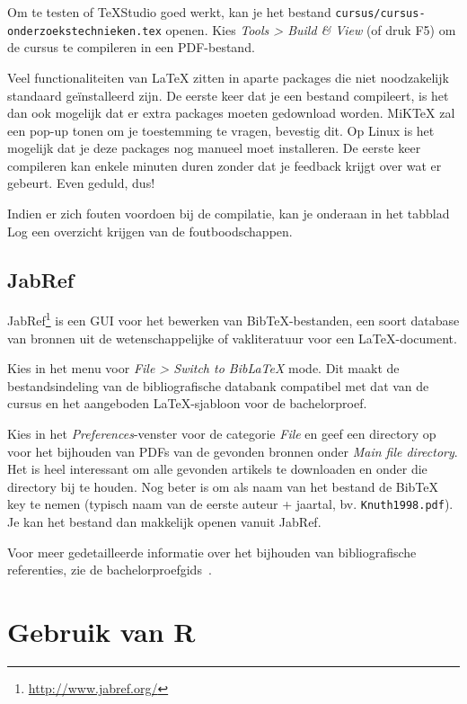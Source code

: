 Om te testen of TeXStudio goed werkt, kan je het bestand \texttt{cursus/cursus-onderzoekstechnieken.tex} openen. Kies \emph{Tools > Build \& View} (of druk F5) om de cursus te compileren in een PDF-bestand.

Veel functionaliteiten van \LaTeX{} zitten in aparte packages die niet noodzakelijk standaard geïnstalleerd zijn. De eerste keer dat je een bestand compileert, is het dan ook mogelijk dat er extra packages moeten gedownload worden. MiK\TeX{} zal een pop-up tonen om je toestemming te vragen, bevestig dit. Op Linux is het mogelijk dat je deze packages nog manueel moet installeren. De eerste keer compileren kan enkele minuten duren zonder dat je feedback krijgt over wat er gebeurt. Even geduld, dus!

Indien er zich fouten voordoen bij de compilatie, kan je onderaan in het tabblad Log een overzicht krijgen van de foutboodschappen.

\subsection{JabRef}

JabRef\footnote{\url{http://www.jabref.org/}} is een GUI voor het bewerken van Bib\TeX{}-bestanden, een soort database van bronnen uit de wetenschappelijke of vakliteratuur voor een \LaTeX{}-document.

Kies in het menu voor \emph{File > Switch to BibLaTeX} mode. Dit maakt de bestandsindeling van de bibliografische databank compatibel met dat van de cursus en het aangeboden \LaTeX{}-sjabloon voor de bachelorproef.

Kies in het \emph{Preferences}-venster voor de categorie \emph{File} en geef een directory op voor het bijhouden van PDFs van de gevonden bronnen onder \emph{Main file directory}. Het is heel interessant om alle gevonden artikels te downloaden en onder die directory bij te houden. Nog beter is om als naam van het bestand de Bib\TeX{} key te nemen (typisch naam van de eerste auteur + jaartal, bv. \texttt{Knuth1998.pdf}). Je kan het bestand dan makkelijk openen vanuit JabRef.

Voor meer gedetailleerde informatie over het bijhouden van bibliografische referenties, zie de bachelorproefgids~\autocite{VanVreckem2017}.


\section{Gebruik van R}

